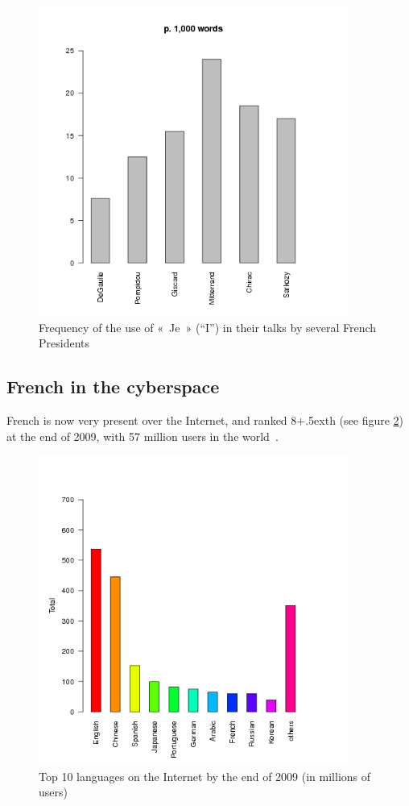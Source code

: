 \begin{multicols}{2}
\begin{figure}[ht]
\begin{center}
 \includegraphics[height=4.0in]{_media/french/je_freq_eng.png} 
  \caption{Frequency of the use of «~Je~» (``I'') in their talks by several French Presidents}
  \label{fig:je_stats_en}
\end{center}
\end{figure}

\subsection{French in the cyberspace}

French is now very present over the Internet, and ranked
8\raise+.5ex\hbox{th} (see figure \ref{fig:internettop10_en}) at the end
of 2009, with 57 million users in the world~\cite{internettop10}.

\begin{figure}[ht]
\begin{center}
 \includegraphics[height=4.0in]{_media/french/french_pix2_top_10_Internet_languages_2010_english.png}
  \caption{Top 10 languages on the Internet by the end of 2009 (in millions of users)~\cite{internettop10}}
  \label{fig:internettop10_en}
\end{center}
\end{figure}


\end{multicols}
